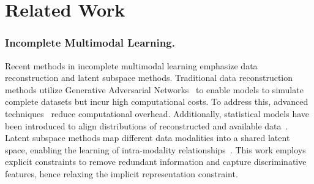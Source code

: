 \section{Related Work}
\subsubsection{Incomplete Multimodal Learning.} 
Recent methods in incomplete multimodal learning emphasize data reconstruction and latent subspace methods. Traditional data reconstruction methods utilize Generative Adversarial Networks~\cite{jue2019integrating,liu2021face} to enable models to simulate complete datasets but incur high computational costs. To address this, advanced techniques~\cite{li2023missing, miao2023multimodal, xiong2023client, poudel2024car, hu2025ophnet, xu2024polyp} reduce computational overhead. Additionally, statistical models have been introduced to align distributions of reconstructed and available data~\cite{zou2023reliable,wang2023distribution}. Latent subspace methods map different data modalities into a shared latent space, enabling the learning of intra-modality relationships~\cite{ebrahimi2023lanistr,sun2024redcore,wang2023distribution}. This work employs explicit constraints to remove redundant information and capture discriminative features, hence relaxing the implicit representation constraint.

